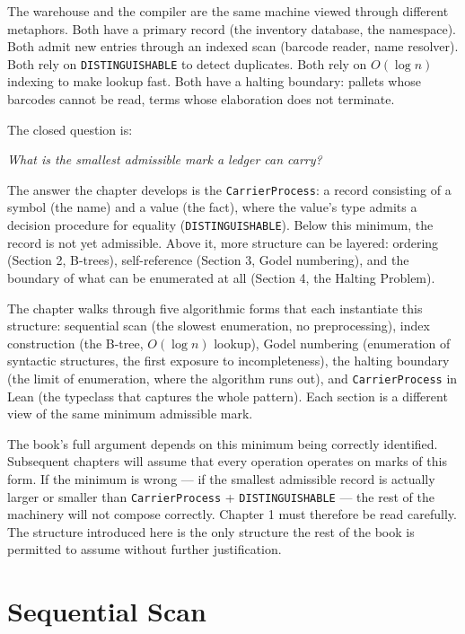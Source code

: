 \begin{chapteressay}
The warehouse and the compiler are the same machine viewed through
different metaphors. Both have a primary record (the inventory database,
the namespace). Both admit new entries through an indexed scan
(barcode reader, name resolver). Both rely on \texttt{DISTINGUISHABLE}
to detect duplicates. Both rely on $O(\log n)$ indexing to make lookup
fast. Both have a halting boundary: pallets whose barcodes cannot be
read, terms whose elaboration does not terminate.

The closed question is:

\begin{center}
\emph{What is the smallest admissible mark a ledger can carry?}
\end{center}

The answer the chapter develops is the \texttt{CarrierProcess}: a
record consisting of a symbol (the name) and a value (the fact), where
the value's type admits a decision procedure for equality
(\texttt{DISTINGUISHABLE}). Below this minimum, the record is not yet
admissible. Above it, more structure can be layered: ordering (Section
2, B-trees), self-reference (Section 3, Godel numbering), and the
boundary of what can be enumerated at all (Section 4, the Halting
Problem).

The chapter walks through five algorithmic forms that each instantiate
this structure: sequential scan (the slowest enumeration, no
preprocessing), index construction (the B-tree, $O(\log n)$ lookup),
Godel numbering (enumeration of syntactic structures, the first
exposure to incompleteness), the halting boundary (the limit of
enumeration, where the algorithm runs out), and \texttt{CarrierProcess}
in Lean (the typeclass that captures the whole pattern). Each section
is a different view of the same minimum admissible mark.

The book's full argument depends on this minimum being correctly
identified. Subsequent chapters will assume that every operation
operates on marks of this form. If the minimum is wrong --- if the
smallest admissible record is actually larger or smaller than
\texttt{CarrierProcess} + \texttt{DISTINGUISHABLE} --- the rest of the
machinery will not compose correctly. Chapter 1 must therefore be read
carefully. The structure introduced here is the only structure the rest
of the book is permitted to assume without further justification.

\end{chapteressay}

\section{Sequential Scan}
\label{se:sequential-scan}

